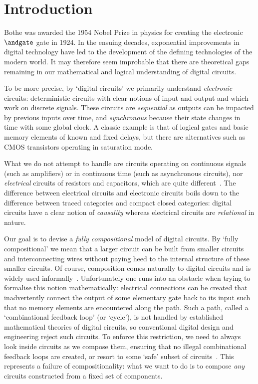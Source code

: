 \documentclass{lmcs}
\begin{document}
\section{Introduction}

Bothe was awarded the 1954 Nobel Prize in physics for creating the electronic
\(\andgate\) gate in 1924.
In the ensuing decades, exponential improvements in digital technology have led
to the development of the defining technologies of the modern world.
It may therefore seem improbable that there are theoretical gaps remaining in
our mathematical and logical understanding of digital circuits.

To be more precise, by `digital circuits' we primarily understand
\emph{electronic} circuits: deterministic circuits with clear notions of
input and output and which work on discrete signals.
These circuits are \emph{sequential} as outputs can be impacted by previous
inputs over time, and \emph{synchronous} because their state changes in time
with some global clock.
A classic example is that of logical gates and basic memory elements of known
and fixed delays, but there are alternatives such as CMOS transistors operating
in saturation mode.

What we do not attempt to handle are circuits operating on continuous signals
(such as amplifiers) or in continuous time (such as asynchronous circuits), nor
\emph{electrical} circuits of resistors and capacitors, which are quite
different~\cite{boisseau2022string}.
The difference between electrical circuits and electronic circuits boils down to
the difference between traced categories and compact closed categories: digital
circuits have a clear notion of \emph{causality} whereas electrical circuits are
\emph{relational} in nature.

Our goal is to devise a \emph{fully compositional} model of digital circuits.
By `fully compositional' we mean that a larger circuit can be built from smaller
circuits and interconnecting wires without paying heed to the internal structure
of these smaller circuits.
Of course, composition comes naturally to digital circuits and is widely used
informally~\cite{gordon1982model}.
Unfortunately one runs into an obstacle when trying to formalise this notion
mathematically: electrical connections can be created that inadvertently
connect the output of some elementary gate back to
its input such that no memory elements are encountered along the path.
Such a path, called a `combinational feedback loop' (or `cycle'), is not handled
by established mathematical theories of digital circuits, so conventional
digital design and engineering reject such circuits.
To enforce this restriction, we need to always look inside circuits as we
compose them, ensuring that no illegal combinational feedback loops are created,
or resort to some `safe' subset of circuits~\cite{christensen2021wire}.
This represents a failure of compositionality: what we want to do is to compose
\emph{any} circuits constructed from a fixed set of components.
\end{document}
